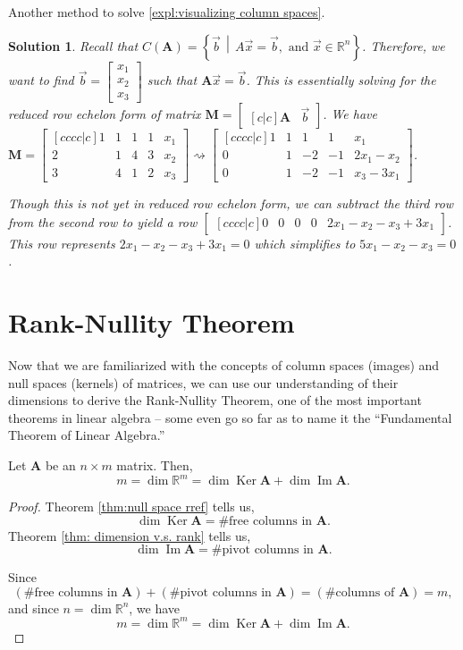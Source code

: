 \documentclass[]{book}
\DeclareMathOperator{\spacedim}{dim}
\DeclareMathOperator{\image}{Im}
\DeclareMathOperator{\kernel}{Ker}
\newcommand{\vecxxx}[1][x]{\ensuremath{\begin{bmatrix}
#1_1 \\
#1_2 \\
#1_3
\end{bmatrix}}}
\newcommand{\suchthat}{\,\middle|\,}
\newcommand{\mat}[1]{\ensuremath{\mathbf{#1}}}
\newcommand{\R}{\ensuremath{\mathbb{R}}}
\newtheorem*{solution}{Solution}
\begin{document}
\begin{example}
    Another method to solve \ref{expl:visualizing column spaces}.
\begin{solution}
    Recall that $C(\mat{A})=\left\{\vec{b} \suchthat A\vec{x}=\vec{b}, \text{ and }\vec{x} \in \mathbb{R}^n\right\}$. Therefore, we want to find $\vec{b}=\vecxxx$ such that $\mat{A} \vec{x} = \vec{b}$. This is essentially solving for the reduced row echelon form of matrix $\mat{M}=\begin{bmatrix}[c|c]\mat{A} & \vec{b}\end{bmatrix}$. 
    We have $\mat{M}=\begin{bmatrix}[cccc|c]
    1 & 1 & 1 & 1 & x_1 \\
    2 & 1 & 4 & 3 & x_2 \\
    3 & 4 & 1 & 2 & x_3 \end{bmatrix} \rightsquigarrow \begin{bmatrix}[cccc|c]
    \boxed{1} & 1 & 1 & 1 & x_1 \\
    0 & 1 & -2 & -1 & 2x_1-x_2 \\
    0 & 1 & -2 & -1 & x_3-3x_1 \end{bmatrix}$.
    
    Though this is not yet in reduced row echelon form, we can subtract the third row from the second row to yield a row $\begin{bmatrix}[cccc|c]0 & 0 & 0 & 0 & 2x_1-x_2-x_3+3x_1\end{bmatrix}$. This row represents $2x_1-x_2-x_3+3x_1=0$ which simplifies to $5x_1-x_2-x_3 = 0$. \hfill \qedsymbol
\end{solution}
\end{example}

\section{Rank-Nullity Theorem}
\label{section: rnt}
Now that we are familiarized with the concepts of column spaces (images) and null spaces (kernels) of matrices, we can use our understanding of their dimensions to derive the Rank-Nullity Theorem, one of the most important theorems in linear algebra -- some even go so far as to name it the ``Fundamental Theorem of Linear Algebra.''

\begin{theorem}
    \label{thm: rnt}
    Let $\mat{A}$ be an $n \times m$ matrix. Then, 
    \[m=\spacedim\R^m = \spacedim\kernel\mat{A} + \spacedim\image\mat{A}.\]
\begin{proof}
    Theorem \ref{thm:null space rref} tells us,
    \[\spacedim\kernel\mat{A} = \text{\# free columns in $\mat{A}$}.\]
    Theorem \ref{thm: dimension v.s. rank} tells us, 
    \[\spacedim\image\mat{A} = \text{\# pivot columns in $\mat{A}$}.\]
    
    Since \[(\text{\# free columns in $\mat{A}$}) + (\text{\# pivot columns in $\mat{A}$}) = (\text{\# columns of $\mat{A}$}) = m,\]
    and since $n = \spacedim\R^n$, we have
    \[m=\spacedim\R^m = \spacedim\kernel\mat{A} + \spacedim\image\mat{A}.\]
\end{proof}
\end{theorem}
\end{document}
